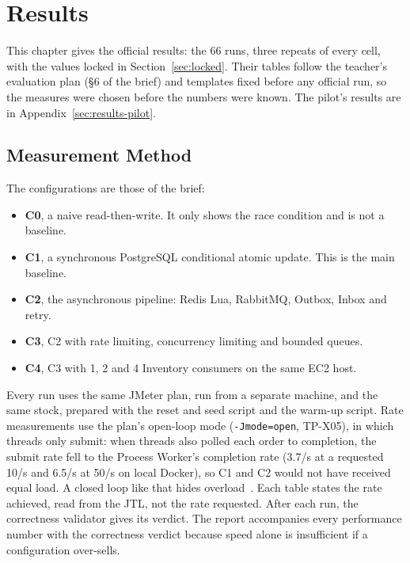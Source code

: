 \documentclass[a4paper]{report}
\begin{document}
\chapter{Results}
\label{sec:results-official-ch}

This chapter gives the official results: the 66 runs, three repeats of every
cell, with the values locked in Section~\ref{sec:locked}. Their tables follow
the teacher's evaluation plan (\S6 of the brief) and templates fixed before
any official run, so the measures were chosen before the numbers were known.
The pilot's results are in Appendix~\ref{sec:results-pilot}.

\section{Measurement Method}

The configurations are those of the brief:
\begin{itemize}
  \item \textbf{C0}, a naive read-then-write. It only shows the race
    condition and is not a baseline.
  \item \textbf{C1}, a synchronous PostgreSQL conditional atomic update. This
    is the main baseline.
  \item \textbf{C2}, the asynchronous pipeline: Redis Lua, RabbitMQ, Outbox,
    Inbox and retry.
  \item \textbf{C3}, C2 with rate limiting, concurrency limiting and bounded
    queues.
  \item \textbf{C4}, C3 with 1, 2 and 4 Inventory consumers on the same EC2
    host.
\end{itemize}
Every run uses the same JMeter plan, run from a separate machine, and the
same stock, prepared with the reset and seed script and the warm-up script.
Rate measurements use the plan's open-loop mode
(\texttt{-Jmode=open}, TP-X05), in which threads only submit: when threads also
polled each order to completion, the submit rate fell to the Process Worker's
completion rate (3.7/s at a requested 10/s and 6.5/s at 50/s on local Docker),
so C1 and C2 would not have received equal load. A closed loop like that
hides overload~\cite{schroeder-open-closed}. Each table states the rate
achieved, read from the JTL, not the rate requested. After each run,
the correctness validator gives its verdict.
The report accompanies every performance number with the correctness verdict
because speed alone is insufficient if a configuration over-sells.
\end{document}
